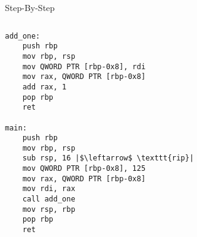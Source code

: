 \documentclass[hyphens,aspectratio=169]{beamer}
\begin{document}
\begin{frame}[fragile]{Step-By-Step}
    \begin{columns}
        \begin{column}{0.33\textwidth}
            \begin{verbatim}
add_one:
    push rbp
    mov rbp, rsp
    mov QWORD PTR [rbp-0x8], rdi
    mov rax, QWORD PTR [rbp-0x8]
    add rax, 1
    pop rbp
    ret

main:
    push rbp
    mov rbp, rsp
    sub rsp, 16 |$\leftarrow$ \texttt{rip}|
    mov QWORD PTR [rbp-0x8], 125
    mov rax, QWORD PTR [rbp-0x8]
    mov rdi, rax
    call add_one
    mov rsp, rbp
    pop rbp
    ret
            \end{verbatim}
        \end{column}
        \begin{column}{0.33\textwidth}
\end{column}
\end{columns}
\end{frame}
\end{document}

